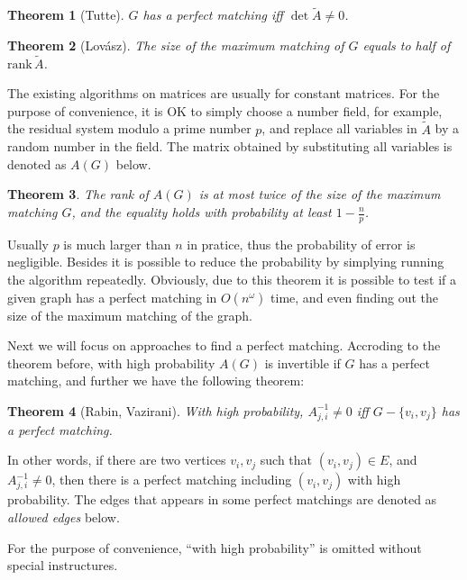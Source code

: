 \documentclass{article}
\newtheorem{theorem}{Theorem}
\begin{document}
			\begin{theorem}[Tutte]
				$G$ has a perfect matching iff $\det \tilde A \neq 0$.
				\label{tutte}
			\end{theorem}

			\begin{theorem}[Lov\'asz]
				The size of the maximum matching of $G$ equals to half of $\mathrm{rank}\, \tilde A$.
			\end{theorem}

			The existing algorithms on matrices are usually for constant matrices. For the purpose of convenience, it is OK to simply choose a number field, for example, the residual system modulo a prime number $p$, and replace all variables in $\tilde A$ by a random number in the field. The matrix obtained by substituting all variables is denoted as $A(G)$ below.

			\begin{theorem}
				The rank of $A(G)$ is at most twice of the size of the maximum matching $G$, and the equality holds with probability at least $1 - \frac n p$.
			\end{theorem}

			Usually $p$ is much larger than $n$ in pratice, thus the probability of error is negligible. Besides it is possible to reduce the probability by simplying running the algorithm repeatedly. Obviously, due to this theorem it is possible to test if a given graph has a perfect matching in $O(n^\omega)$ time, and even finding out the size of the maximum matching of the graph.

			Next we will focus on approaches to find a perfect matching. Accroding to the theorem before, with high probability $A(G)$ is invertible if $G$ has a perfect matching, and further we have the following theorem:

			\begin{theorem}[Rabin, Vazirani]
				With high probability, $ A_{j, i} ^{-1} \ne 0 $ iff $ G - \{v_i, v_j\} $ has a perfect matching.
				\label{allowed}
			\end{theorem}

			In other words, if there are two vertices $v_i, v_j$ such that $(v_i, v_j) \in E$, and $A_{j, i}^{-1} \ne 0$, then there is a perfect matching including $(v_i, v_j)$ with high probability. The edges that appears in some perfect matchings are denoted as \emph{allowed edges} below.

			For the purpose of convenience, ``with high probability'' is omitted without special instructures.
\end{document}
